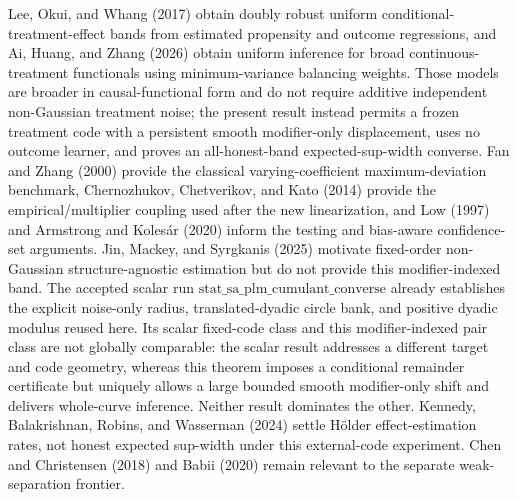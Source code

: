 Lee, Okui, and Whang (2017) obtain doubly robust uniform conditional-treatment-effect bands from estimated propensity and outcome regressions, and Ai, Huang, and Zhang (2026) obtain uniform inference for broad continuous-treatment functionals using minimum-variance balancing weights.  Those models are broader in causal-functional form and do not require additive independent non-Gaussian treatment noise; the present result instead permits a frozen treatment code with a persistent smooth modifier-only displacement, uses no outcome learner, and proves an all-honest-band expected-sup-width converse.  Fan and Zhang (2000) provide the classical varying-coefficient maximum-deviation benchmark, Chernozhukov, Chetverikov, and Kato (2014) provide the empirical/multiplier coupling used after the new linearization, and Low (1997) and Armstrong and Kolesár (2020) inform the testing and bias-aware confidence-set arguments.  Jin, Mackey, and Syrgkanis (2025) motivate fixed-order non-Gaussian structure-agnostic estimation but do not provide this modifier-indexed band.  The accepted scalar run \(\text{stat\_sa\_plm\_cumulant\_converse}\) already establishes the explicit noise-only radius, translated-dyadic circle bank, and positive dyadic modulus reused here.  Its scalar fixed-code class and this modifier-indexed pair class are not globally comparable: the scalar result addresses a different target and code geometry, whereas this theorem imposes a conditional remainder certificate but uniquely allows a large bounded smooth modifier-only shift and delivers whole-curve inference.  Neither result dominates the other.  Kennedy, Balakrishnan, Robins, and Wasserman (2024) settle Hölder effect-estimation rates, not honest expected sup-width under this external-code experiment.  Chen and Christensen (2018) and Babii (2020) remain relevant to the separate weak-separation frontier.